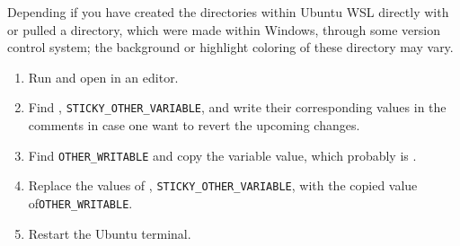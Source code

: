 
Depending if you have created the directories within Ubuntu WSL directly with  or pulled a directory,
which were made within Windows, through some version control system; the background or highlight coloring
of these directory may vary.

\begin{enumerate}
    \item Run  and open  in an editor.
    
    \item Find , \texttt{STICKY_OTHER_VARIABLE},  and write their corresponding values in the
    comments in case one want to revert the upcoming changes.
    
    \item Find \texttt{OTHER_WRITABLE} and copy the variable value, which probably is .
    
    \item Replace the values of , \texttt{STICKY_OTHER_VARIABLE},  with the copied value of\texttt{OTHER_WRITABLE}.
    
    \item Restart the Ubuntu terminal.
\end{enumerate}